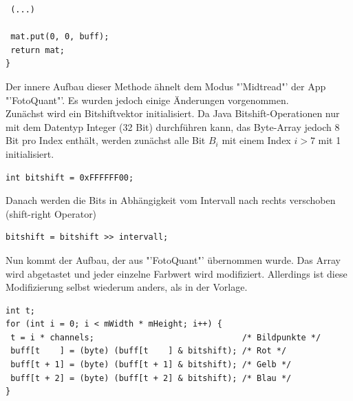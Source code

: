 \begin{description}
\begin{lstlisting}
 (...) 
 
 mat.put(0, 0, buff);                                			
 return mat;                                          			
}
\end{lstlisting}

Der innere Aufbau dieser Methode ähnelt dem Modus "'Midtread"' der App "'FotoQuant"'. Es wurden jedoch einige Änderungen vorgenommen.\\
Zunächst wird ein Bitshiftvektor initialisiert. Da Java Bitshift-Operationen nur mit dem Datentyp \textcolor{blau}{Integer} (32 Bit) durchführen kann, das Byte-Array jedoch 8 Bit pro Index enthält, werden zunächst alle Bit \(B_i\) mit einem Index \(i>7\) mit \textcolor{blau}{1} initialisiert.
\begin{lstlisting}
int bitshift = 0xFFFFFF00;
\end{lstlisting} 
Danach werden die Bits in Abhängigkeit vom Intervall nach rechts verschoben (shift-right Operator)
\begin{lstlisting}
bitshift = bitshift >> intervall;
\end{lstlisting} 
Nun kommt der Aufbau, der aus "'FotoQuant"' übernommen wurde. Das Array wird abgetastet und jeder einzelne Farbwert wird modifiziert. Allerdings ist diese Modifizierung selbst wiederum anders, als in der Vorlage.
\begin{lstlisting}
int t;
for (int i = 0; i < mWidth * mHeight; i++) {
 t = i * channels;                              /* Bildpunkte */
 buff[t    ] = (byte) (buff[t    ] & bitshift); /* Rot */
 buff[t + 1] = (byte) (buff[t + 1] & bitshift); /* Gelb */
 buff[t + 2] = (byte) (buff[t + 2] & bitshift); /* Blau */
}
\end{lstlisting} 


\end{description}


\newpage



